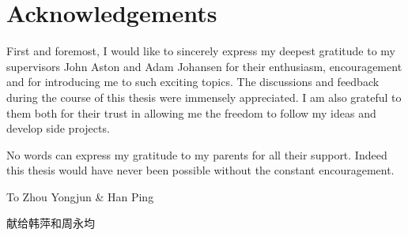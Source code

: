 \chapter*{Acknowledgements}

First and foremost, I would like to sincerely express my deepest gratitude to
my supervisors John Aston and Adam Johansen for their enthusiasm,
encouragement and for introducing me to such exciting topics. The discussions
and feedback during the course of this thesis were immensely appreciated. I
am also grateful to them both for their trust in allowing me the freedom to
follow my ideas and develop side projects.

No words can express my gratitude to my parents for all their support. Indeed
this thesis would have never been possible without the constant encouragement.

\baselineskip
\begin{center}
  \Large To Zhou Yongjun \& Han Ping
\end{center}
\begin{center}
  \Large 献给韩萍和周永均
\end{center}
